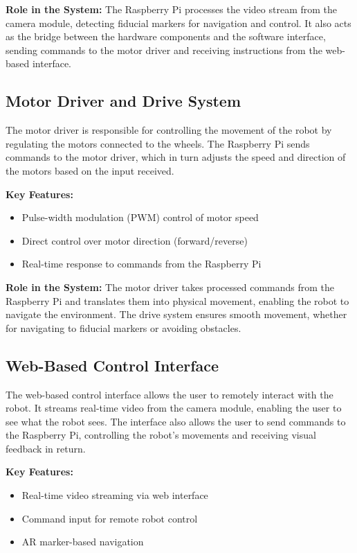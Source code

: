 \textbf{Role in the System:}
The Raspberry Pi processes the video stream from the camera module, detecting fiducial markers for navigation and control. It also acts as the bridge between the hardware components and the software interface, sending commands to the motor driver and receiving instructions from the web-based interface.

\subsection{\label{subsec:motor} Motor Driver and Drive System}
The motor driver is responsible for controlling the movement of the robot by regulating the motors connected to the wheels. The Raspberry Pi sends commands to the motor driver, which in turn adjusts the speed and direction of the motors based on the input received.

\textbf{Key Features:}
\begin{itemize}
	\item Pulse-width modulation (PWM) control of motor speed
	\item Direct control over motor direction (forward/reverse)
	\item Real-time response to commands from the Raspberry Pi
\end{itemize}

\textbf{Role in the System:}
The motor driver takes processed commands from the Raspberry Pi and translates them into physical movement, enabling the robot to navigate the environment. The drive system ensures smooth movement, whether for navigating to fiducial markers or avoiding obstacles.

\subsection{\label{subsec:web_interface} Web-Based Control Interface}
The web-based control interface allows the user to remotely interact with the robot. It streams real-time video from the camera module, enabling the user to see what the robot sees. The interface also allows the user to send commands to the Raspberry Pi, controlling the robot's movements and receiving visual feedback in return.

\textbf{Key Features:}
\begin{itemize}
	\item Real-time video streaming via web interface
	\item Command input for remote robot control
	\item AR marker-based navigation
\end{itemize}

